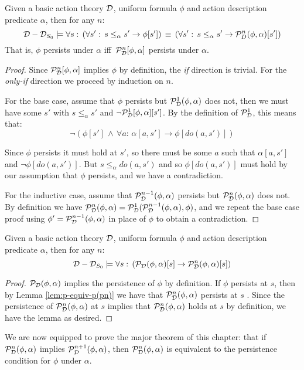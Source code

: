 \begin{lemma}
Given a basic action theory $\mathcal{D}$, uniform formula $\phi$
and action description predicate $\alpha$, then for any $n$:\label{lem:p-equiv-p(pn)}\[
\mathcal{D}-\mathcal{D}_{S_{0}}\models\forall s:\,\left(\forall s':\, s\leq_{\alpha}s'\rightarrow\phi[s']\right)\,\equiv\,\left(\forall s':\, s\leq_{\alpha}s'\rightarrow\mathcal{P}_{D}^{n}(\phi,\alpha)[s']\right)\]
 That is, $\phi$ persists under $\alpha$ iff $\,\mathcal{P}_{\mathcal{D}}^{n}[\phi,\alpha]$
persists under $\alpha$. 
\end{lemma}
\begin{proof}
Since $\mathcal{P}_{\mathcal{D}}^{n}[\phi,\alpha]$ implies $\phi$ by definition,
the \emph{if} direction is trivial. For the \emph{only-if} direction
we proceed by induction on $n$.

For the base case, assume that $\phi$ persists but $\mathcal{P}_{\mathcal{D}}^{1}(\phi,\alpha)$
does not, then we must have some $s'$ with $s\leq_{\alpha}s'$ and
$\neg\mathcal{P}_{\mathcal{D}}^{1}[\phi,\alpha][s']$. By the definition of $\mathcal{P}_{\mathcal{D}}^{1}$,
this means that:\[
\neg\left(\phi[s']\,\wedge\,\forall a:\,\alpha[a,s']\rightarrow\phi[do(a,s')]\right)\]


Since $\phi$ persists it must hold at $s'$, so there must be some
$a$ such that $\alpha[a,s']$ and $\neg\phi[do(a,s')]$. But $s\leq_{\alpha}do(a,s')$
and so $\phi[do(a,s')]$ must hold by our assumption that $\phi$
persists, and we have a contradiction.

For the inductive case, assume that $\mathcal{P}_{\mathcal{D}}^{n-1}(\phi,\alpha)$
persists but $\mathcal{P}_{\mathcal{D}}^{n}(\phi,\alpha)$ does not. By definition
we have $\mathcal{P}_{\mathcal{D}}^{n}(\phi,\alpha)=\mathcal{P}_{\mathcal{D}}^{1}(\mathcal{P}_{\mathcal{D}}^{n-1}(\phi,\alpha),\phi)$,
and we repeat the base case proof using $\phi'=\mathcal{P}_{\mathcal{D}}^{n-1}(\phi,\alpha)$
in place of $\phi$ to obtain a contradiction. 
\end{proof}
\begin{lemma}
Given a basic action theory $\mathcal{D}$, uniform formula $\phi$
and action description predicate $\alpha$, then for any $n$:\label{lem:p-implies-pn}\[
\mathcal{D}-\mathcal{D}_{S_{0}}\models\forall s:\,\left(\mathcal{P}_{\mathcal{D}}(\phi,\alpha)[s]\rightarrow\mathcal{P}_{\mathcal{D}}^{n}(\phi,\alpha)[s]\right)\]

\end{lemma}
\begin{proof}
$\mathcal{P}_{\mathcal{D}}(\phi,\alpha)$ implies the persistence of $\phi$
by definition. If $\phi$ persists at $s$, then by Lemma \ref{lem:p-equiv-p(pn)}
we have that $\mathcal{P}_{\mathcal{D}}^{n}(\phi,\alpha)$ persists at $s$ . Since
the persistence of $\mathcal{P}_{\mathcal{D}}^{n}(\phi,\alpha)$ at
$s$ implies that $\mathcal{P}_{\mathcal{D}}^{n}(\phi,\alpha)$ holds
at $s$ by definition, we have the lemma as desired. 
\end{proof}
We are now equipped to prove the major theorem of this chapter: that
if $\mathcal{P}_{\mathcal{D}}^{n}(\phi,\alpha)$ implies $\mathcal{P}_{\mathcal{D}}^{n+1}(\phi,\alpha)$,
then $\mathcal{P}_{\mathcal{D}}^{n}(\phi,\alpha)$ is equivalent to
the persistence condition for $\phi$ under $\alpha$.\newpage{}

